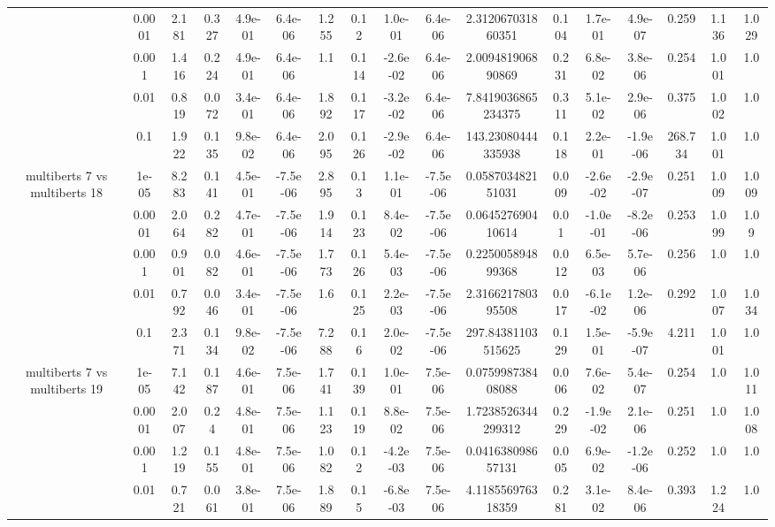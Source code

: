 \begin{tabular}{|c|c|c|c|c|c|c|c|c|c|c|c|c|c|c|c|c|}
 & 0.0001 & 2.181 & 0.327 & 4.9e-01 & 6.4e-06 & 1.255 & 0.12 & 1.0e-01 & 6.4e-06 & 2.312067031860351 & 0.104 & 1.7e-01 & 4.9e-07 & 0.259 & 1.136 & 1.029 \\
 & 0.001 & 1.416 & 0.224 & 4.9e-01 & 6.4e-06 & 1.1 & 0.114 & -2.6e-02 & 6.4e-06 & 2.009481906890869 & 0.231 & 6.8e-02 & 3.8e-06 & 0.254 & 1.001 & 1.0 \\
 & 0.01 & 0.819 & 0.072 & 3.4e-01 & 6.4e-06 & 1.892 & 0.117 & -3.2e-02 & 6.4e-06 & 7.8419036865234375 & 0.311 & 5.1e-02 & 2.9e-06 & 0.375 & 1.002 & 1.0 \\
 & 0.1 & 1.922 & 0.135 & 9.8e-02 & 6.4e-06 & 2.095 & 0.126 & -2.9e-02 & 6.4e-06 & 143.23080444335938 & 0.118 & 2.2e-01 & -1.9e-06 & 268.734 & 1.001 & 1.0 \\
\hline
\multirow{5}{*}{multiberts 7 vs multiberts 18} & 1e-05 & 8.283 & 0.141 & 4.5e-01 & -7.5e-06 & 2.895 & 0.13 & 1.1e-01 & -7.5e-06 & 0.058703482151031 & 0.009 & -2.6e-02 & -2.9e-07 & 0.251 & 1.009 & 1.009 \\
 & 0.0001 & 2.064 & 0.282 & 4.7e-01 & -7.5e-06 & 1.914 & 0.123 & 8.4e-02 & -7.5e-06 & 0.064527690410614 & 0.01 & -1.0e-01 & -8.2e-06 & 0.253 & 1.099 & 1.09 \\
 & 0.001 & 0.901 & 0.082 & 4.6e-01 & -7.5e-06 & 1.773 & 0.126 & 5.4e-03 & -7.5e-06 & 0.225005894899368 & 0.012 & 6.5e-03 & 5.7e-06 & 0.256 & 1.0 & 1.0 \\
 & 0.01 & 0.792 & 0.046 & 3.4e-01 & -7.5e-06 & 1.6 & 0.125 & 2.2e-03 & -7.5e-06 & 2.316621780395508 & 0.017 & -6.1e-02 & 1.2e-06 & 0.292 & 1.007 & 1.034 \\
 & 0.1 & 2.371 & 0.134 & 9.8e-02 & -7.5e-06 & 7.288 & 0.16 & 2.0e-02 & -7.5e-06 & 297.84381103515625 & 0.129 & 1.5e-01 & -5.9e-07 & 4.211 & 1.001 & 1.0 \\
\hline
\multirow{5}{*}{multiberts 7 vs multiberts 19} & 1e-05 & 7.142 & 0.187 & 4.6e-01 & 7.5e-06 & 1.741 & 0.139 & 1.0e-01 & 7.5e-06 & 0.075998738408088 & 0.006 & 7.6e-02 & 5.4e-07 & 0.254 & 1.0 & 1.011 \\
 & 0.0001 & 2.007 & 0.24 & 4.8e-01 & 7.5e-06 & 1.123 & 0.119 & 8.8e-02 & 7.5e-06 & 1.7238526344299312 & 0.229 & -1.9e-02 & 2.1e-06 & 0.251 & 1.0 & 1.008 \\
 & 0.001 & 1.219 & 0.155 & 4.8e-01 & 7.5e-06 & 1.082 & 0.12 & -4.2e-03 & 7.5e-06 & 0.041638098657131 & 0.005 & 6.9e-02 & -1.2e-06 & 0.252 & 1.0 & 1.0 \\
 & 0.01 & 0.721 & 0.061 & 3.8e-01 & 7.5e-06 & 1.889 & 0.15 & -6.8e-03 & 7.5e-06 & 4.118556976318359 & 0.281 & 3.1e-02 & 8.4e-06 & 0.393 & 1.224 & 1.0 \\

\end{tabular}
